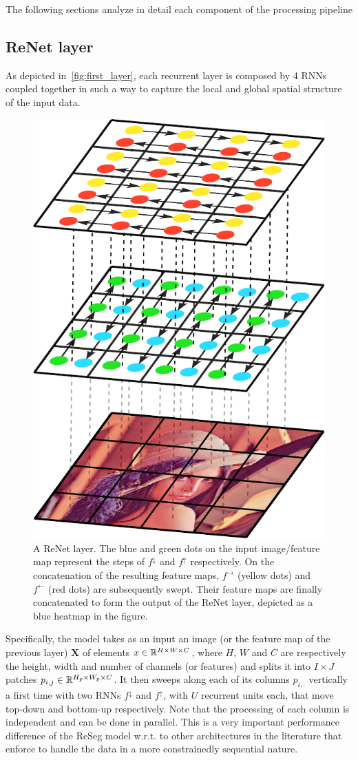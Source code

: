 The following sections analyze in detail each component of the processing
pipeline

\subsection{ReNet layer}

As depicted in~\autoref{fig:first_layer}, each recurrent layer is composed
by 4 RNNs coupled together in such a way to capture the local and global
spatial structure of the input data.

\begin{figure}[t]
    \begin{center}
        \includegraphics[width=0.3\columnwidth]{pdf/first_layer.pdf}
        \caption{A ReNet layer. The blue and green dots on the input
            image/feature map represent the steps of $f^{\downarrow}$ and
            $f^{\uparrow}$ respectively. On the concatenation of the resulting
            feature maps, $f^{\rightarrow}$ (yellow dots) and $f^{\leftarrow}$
            (red dots) are subsequently swept. Their feature maps are finally
            concatenated to form the output of the ReNet layer, depicted as a
            blue heatmap in the figure.}
        \label{fig:first_layer}
        \vspace{-5mm}
    \end{center}
\end{figure}


Specifically, the model takes as an input an image (or the feature map of the
previous layer) $\mathbf{X}$ of elements $x \in \mathbb{R}^{H \times W \times C}$,
where $H$, $W$ and $C$ are respectively the height, width and number of
channels (or features) and splits it into $I \times J$ patches $p_{i,j} \in
\mathbb{R}^{H_p \times W_p \times C}$. It then sweeps along each of its columns
$p_{i,\cdot}$ vertically a first time with two RNNs $f^{\downarrow}$ and
$f^{\uparrow}$, with $U$ recurrent units each, that move top-down and bottom-up
respectively. Note that the processing of each column is independent and can be
done in parallel. This is a very important performance difference of the ReSeg
model w.r.t. to other architectures in the literature that enforce to handle
the data in a more constrainedly sequential nature.

